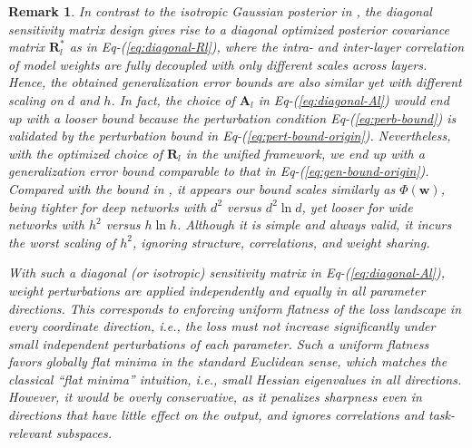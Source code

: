 \documentclass[journal]{IEEEtran} %
\def\eqref#1{Eq-(\ref{#1})}
\newtheorem{remark}{Remark}%
\def\vw{{\bm{w}}}
\def\mA{{\bm{A}}}
\def\mR{{\bm{R}}}
\begin{document}
\begin{remark} \upshape
    In contrast to the isotropic Gaussian posterior in \cite{neyshabur2018pac}, the diagonal sensitivity matrix design gives rise to a diagonal optimized posterior covariance matrix $\mR_l^*$ as in \eqref{eq:diagonal-Rl}, where the intra- and inter-layer correlation of model weights are fully decoupled with only different scales across layers. Hence, the obtained generalization error bounds are also similar yet with different scaling on $d$ and $h$. In fact, the choice of $\mA_l$ in \eqref{eq:diagonal-Al} would end up with a looser bound because the perturbation condition \eqref{eq:perb-bound} is validated by the perturbation bound in \eqref{eq:pert-bound-origin}. Nevertheless, with the optimized choice of $\mR_l$ in the unified framework, we end up with a generalization error bound comparable to that in \eqref{eq:gen-bound-origin}.
    Compared with the bound in \cite{neyshabur2018pac}, it appears our bound scales similarly as $\Phi(\vw)$, being tighter for deep networks with $d^2$ versus $d^2 \ln d$, yet looser for wide networks with $h^2$ versus $h\ln h$. 
    Although it is simple and always valid, it incurs the worst scaling of $h^2$, ignoring structure, correlations, and weight sharing.

    With such a diagonal (or isotropic) sensitivity matrix in \eqref{eq:diagonal-Al}, weight perturbations are applied independently and equally in all parameter directions. This corresponds to enforcing uniform flatness of the loss landscape in every coordinate direction, i.e., the loss must not increase significantly under small independent perturbations of each parameter. Such a uniform flatness favors globally flat minima in the standard Euclidean sense, which matches the classical ``flat minima'' intuition, i.e., small Hessian eigenvalues in all directions. However, it would be overly conservative, as it penalizes sharpness even in directions that have little effect on the output, and ignores correlations and task-relevant subspaces.
\end{remark}
\end{document}
